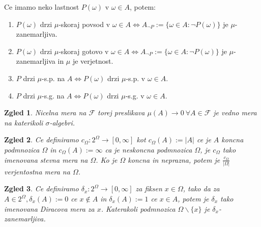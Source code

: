 \documentclass[a4paper,12pt]{article}
\newtheorem{zgled}{Zgled}
\newcommand{\F}{\mathcal{F}}
\begin{document}
            Ce imamo neko lastnost $P(\omega)$ v $\omega \in A$, potem: \\
            \begin{enumerate}
                \item $P(\omega)$ drzi $\mu$-skoraj povsod v $\omega \in A \iff A_{\neg P} := \{\omega \in A: \neg P(\omega)\}$ je $\mu$-zanemarljiva.       
                \item $P(\omega)$ drzi $\mu$-skoraj gotovo v $\omega \in A \iff A_{\neg P} := \{\omega \in A: \neg P(\omega)\}$ je $\mu$-zanemarljiva in $\mu$ je verjetnost.
                \item $P$ drzi $\mu$-s.p. na $A \iff P(\omega)$ drzi $\mu$-s.p. v $\omega \in A$. 
                \item $P$ drzi $\mu$-s.g. na $A \iff P(\omega)$ drzi $\mu$-s.g. v $\omega \in A$. 
            \end{enumerate}
            \begin{zgled}
                Nicelna mera na $\F$ torej preslikava $\mu(A) \rightarrow 0 \ \forall A \in \F$ je vedno mera na katerikoli $\sigma$-algebri.
            \end{zgled}      
            
            \begin{zgled}
                Ce definiramo $c_\Omega:2^\Omega \rightarrow [0, \infty]$ kot $c_\Omega(A) := |A|$ ce je $A$ koncna podmnozica $\Omega$ in $c_\Omega(A) := \infty$ ca je neskoncna podmnozica $\Omega$, je $c_\Omega$ tako imenovana stevna mera na $\Omega$. Ko je $\Omega$ koncna in neprazna, potem je $\frac{c_\Omega}{|\Omega|}$ verjentostna mera na $\Omega$.  
            \end{zgled}

            \begin{zgled}
                Ce definiramo $\delta_x:2^\Omega \rightarrow [0, \infty]$ za fiksen $x \in \Omega$, tako da za $A \in 2^\Omega, \delta_x(A):=0$ ce $x \notin A$ in $\delta_x(A):=1$ ce $x \in A$, potem je $\delta_x$ tako imenovana Diracova mera za $x$. Katerakoli podmnozica $\Omega \backslash \{x\}$ je $\delta_x$-zanemarljiva.                
            \end{zgled}
            
\end{document}
